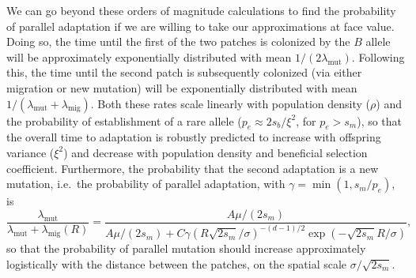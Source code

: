 \documentclass{article}
\newcommand{\revpoint}[2]{}
\newcommand{\migrate}{\lambda_\text{mig}}
\newcommand{\mutrate}{\lambda_\text{mut}}
\newcommand{\Tmig}{T_\text{mig}}
\newcommand{\Tmut}{T_\text{mut}}
\begin{document}
% 

We can go beyond these orders of magnitude calculations to find
the probability of parallel adaptation if we are willing to take our approximations at face value. 
Doing so, the time until the first of the two patches is colonized by the $B$
allele will be approximately exponentially distributed with mean $1/(2
\mutrate)$.
Following this, the time until the second patch is subsequently colonized 
(via either migration or new mutation) 
will be exponentially distributed with mean $1/(\mutrate+\migrate)$.
Both these rates scale linearly with population density ($\rho$) 
and the probability of establishment of a rare allele ($p_e\approx 2 s_b/\xi^2$, for $p_e>s_m$),
so that the overall time to adaptation is robustly predicted to increase with offspring variance ($\xi^2$)
and decrease with population density and beneficial selection coefficient.
Furthermore, the probability that the second adaptation is a new mutation,
i.e.\ the probability of parallel adaptation, 
with $\gamma = \min(1,s_m/p_e)$,
is 
\begin{equation} \label{eqn:parallel_prob}
    \frac{\mutrate}{\mutrate+\migrate(R)} = \frac{ A \mu / (2s_m) }{ A \mu / (2s_m) + C \gamma \left(R \sqrt{2 s_m} /\sigma \right)^{-(d-1)/2}\exp\left(- \sqrt{2 s_m} R / \sigma \right) },  
\end{equation}
so that the probability of parallel mutation should increase
approximately logistically with the distance between the patches, on the spatial scale $\sigma/\sqrt{2 s_m}$. \revpoint{2}{13}
\end{document}
